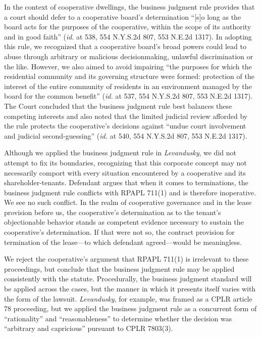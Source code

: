 In the context of cooperative dwellings, the business judgment rule provides
that a court should defer to a cooperative board's determination ``[s]o long as
the board acts for the purposes of the cooperative, within the scope of its
authority and in good faith'' (\textit{id}. at 538, 554 N.Y.S.2d 807, 553 N.E.2d
1317). In adopting this rule, we recognized that a cooperative board's broad
powers could lead to abuse through arbitrary or malicious decisionmaking,
unlawful discrimination or the like. However, we also aimed to avoid impairing
``the purposes for which the residential community and its governing structure
were formed: protection of the interest of the entire community of residents in
an environment managed by the board for the common benefit'' (\textit{id.} at
537, 554 N.Y.S.2d 807, 553 N.E.2d 1317). The Court concluded that the business
judgment rule best balances these competing interests and also noted that the
limited judicial review afforded by the rule protects the cooperative's
decisions against ``undue court involvement and judicial second-guessing''
(\textit{id.} at 540, 554 N.Y.S.2d 807, 553 N.E.2d 1317).

Although we applied the business judgment rule in \textit{Levandusky}, we did
not attempt to fix its boundaries, recognizing that this corporate concept may
not necessarily comport with every situation encountered by a cooperative and
its shareholder-tenants. Defendant argues that when it comes to terminations,
the business judgment rule conflicts with RPAPL 711(1) and is therefore
inoperative. We see no such
conflict. In the realm of cooperative governance and in the lease provision
before us, the cooperative's determination as to the tenant's objectionable
behavior stands as competent evidence necessary to sustain the cooperative's
determination. If that were not so, the contract provision for termination of
the lease---to which defendant agreed---would be meaningless.

We reject the cooperative's argument that RPAPL 711(1) is irrelevant to these
proceedings, but conclude that the business judgment rule may be applied
consistently with the statute. Procedurally, the business judgment standard will
be applied across the cases, but the manner in which it presents itself varies
with the form of the lawsuit. \textit{Levandusky}, for example, was framed as a
CPLR article 78 proceeding, but we applied the business judgment rule as a
concurrent form of ``rationality'' and ``reasonableness'' to determine whether
the decision was ``arbitrary and capricious'' pursuant to CPLR 7803(3).

